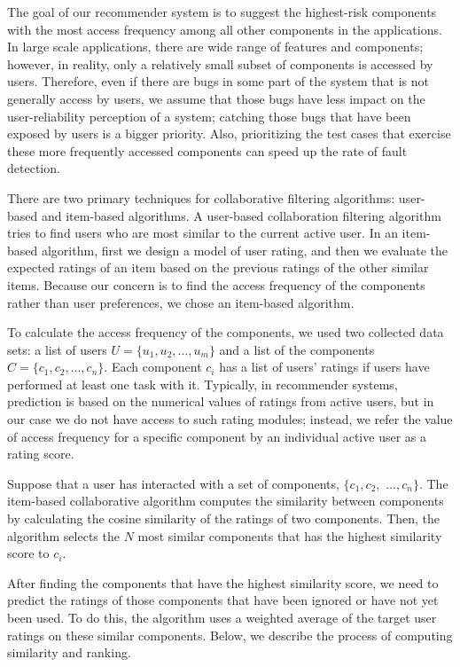 The goal of our recommender system is to suggest the highest-risk 
components with the most access frequency among all other components in the applications. 
In large scale applications, there are wide range of features and components; 
however, in reality, only a relatively small subset of components is accessed by users. 
Therefore, even if there are bugs in some part of the system that is not generally access by  users, we assume that those bugs have less impact on the user-reliability perception
of a system; catching those bugs that have been exposed by users is a bigger priority.
Also, prioritizing the test cases that exercise these more
frequently accessed components can speed up the rate of fault detection. 
 
There are two primary techniques for collaborative filtering algorithms:
user-based and item-based algorithms. 
A user-based collaboration filtering algorithm tries to find 
users who are most similar to the current active user.
In an item-based algorithm, first we design a model of user rating, 
and then we evaluate the expected ratings of an item based on the previous 
ratings of the other similar items. Because our concern is to find the 
access frequency of the components rather than user preferences, 
we chose an item-based algorithm.

To calculate the access frequency of the components,
we used two collected data sets: 
a list of users $U=\{u_1, u_2, ..., u_m\}$ and 
a list of the components $C =\{c_1, c_2, ..., c_n\}$. 
Each component $c_i$  has a list of users' ratings if 
users have performed at least one task with it.
Typically, in recommender systems, prediction is based on the numerical values of 
ratings from active users, but in our case we do not have access to such rating 
modules; instead, we refer the value of access frequency for a specific component 
by an individual active user as a rating score. 

Suppose that a user has interacted with a set of components,
$\{c_1, c_2,$ $..., c_n\}$. 
The item-based collaborative algorithm
computes the similarity between components by calculating the cosine similarity 
of the ratings of two components. 
Then, the algorithm selects the $N$ most similar components 
that has the highest similarity score to $c_i$.

After finding the components that have the highest similarity score, 
we need to predict the ratings of those
components that have been ignored or have not yet been used.
To do this, the algorithm uses a weighted average of the target user ratings
on these similar components.
Below, we describe the process of computing similarity and ranking.

